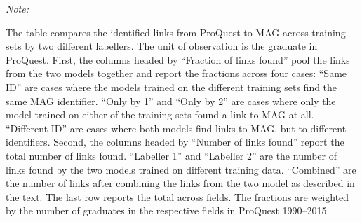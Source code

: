 \begin{table}
\begin{threeparttable}
\begin{tabular}[t]{lrrrrrrr}
\bottomrule
\end{tabular}
\begin{tablenotes}[para]
\small
\item \textit{Note: } 
\item The table compares the identified links from ProQuest to MAG across training sets by two different labellers. The unit of observation is the graduate in ProQuest. First, the columns headed by ``Fraction of links found'' pool the links from the two models together and report the fractions across four cases:  ``Same ID'' are cases where the models trained on the different training sets find the same MAG identifier. ``Only by 1'' and ``Only by 2'' are cases where only the model trained on either of the training sets found a link to MAG at all. ``Different ID'' are cases where both models find links to MAG, but to different identifiers. Second, the columns headed by ``Number of links found'' report the total number of links found. ``Labeller 1'' and ``Labeller 2'' are the number of links found by the two models trained on different training data. ``Combined'' are the number of links after combining the links from the two model as described in the text. The last row reports the total across fields. The fractions are weighted by the number of graduates in the respective fields in ProQuest 1990--2015.
\end{tablenotes}
\end{threeparttable}
\end{table}
